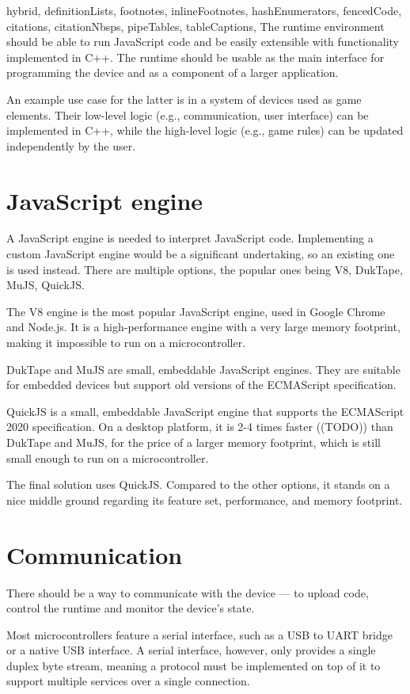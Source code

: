 \begin{markdown*}{%
  hybrid,
  definitionLists,
  footnotes,
  inlineFootnotes,
  hashEnumerators,
  fencedCode,
  citations,
  citationNbsps,
  pipeTables,
  tableCaptions,
}
The runtime environment should be able to run JavaScript code and be easily extensible with functionality implemented in C++. The runtime should be usable as the main interface for programming the device and as a component of a larger application.

An example use case for the latter is in a system of devices used as game elements. Their low-level logic (e.g., communication, user interface) can be implemented in C++, while the high-level logic (e.g., game rules) can be updated independently by the user.

\section{JavaScript engine}

A JavaScript engine is needed to interpret JavaScript code. Implementing a custom JavaScript engine would be a significant undertaking, so an existing one is used instead. There are multiple options, the popular ones being V8, DukTape, MuJS, QuickJS.

The V8 engine is the most popular JavaScript engine, used in Google Chrome and Node.js. It is a high-performance engine with a very large memory footprint, making it impossible to run on a microcontroller.

DukTape and MuJS are small, embeddable JavaScript engines. They are suitable for embedded devices but support old versions of the ECMAScript specification.

QuickJS is a small, embeddable JavaScript engine that supports the ECMAScript 2020 specification. On a desktop platform, it is 2-4 times faster ((TODO)) than DukTape and MuJS, for the price of a larger memory footprint, which is still small enough to run on a microcontroller.

The final solution uses QuickJS. Compared to the other options, it stands on a nice middle ground regarding its feature set, performance, and memory footprint.

\section{Communication}

There should be a way to communicate with the device --- to upload code, control the runtime and monitor the device's state.

Most microcontrollers feature a serial interface, such as a USB to UART bridge or a native USB interface. A serial interface, however, only provides a single duplex byte stream, meaning a protocol must be implemented on top of it to support multiple services over a single connection.


\end{markdown*}
